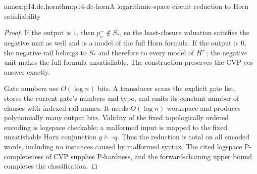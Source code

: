 \begin{annexitem}{annex:p14.dc.horn}{thm:p14-dc-horn}{A logarithmic-space circuit reduction to Horn satisfiability}
\begin{proof}
If the output is \(1\), then \(p_o^-\notin S_*\), so the least-closure
valuation satisfies the negative unit as well and is a model of the full
Horn formula. If the output is \(0\), the negative rail belongs to \(S_*\)
and therefore to every model of \(H^+\); the negative unit makes the full
formula unsatisfiable. The construction preserves the CVP yes answer exactly.

Gate numbers use \(O(\log n)\) bits. A transducer scans the explicit gate
list, stores the current gate's numbers and type, and emits its constant
number of clauses with indexed rail names. It needs \(O(\log n)\) workspace
and produces polynomially many output bits. Validity of the fixed
topologically ordered encoding is logspace checkable; a malformed input is
mapped to the fixed unsatisfiable Horn conjunction \(q\land\neg q\).
Thus the reduction is total on all encoded words, including no instances
caused by malformed syntax. The cited logspace P-completeness of CVP supplies
P-hardness, and the forward-chaining upper bound completes the classification.
\end{proof}
\end{annexitem}
